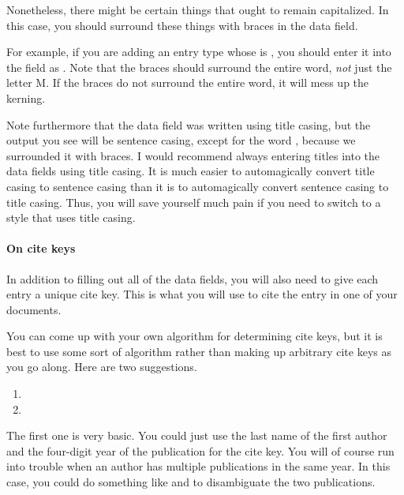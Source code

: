 Nonetheless, there might be certain things that ought to remain capitalized.
In this case, you should surround these things with braces in the data field.

For example, if you are adding an  entry type whose  is , you should enter it into the  field as .
Note that the braces should surround the entire word, \emph{not} just the letter M.
If the braces do not surround the entire word, it will mess up the kerning.

Note furthermore that the data field was written using title casing, but the output you see will be sentence casing, except for the word , because we surrounded it with braces.
I would recommend always entering titles into the data fields using title casing.
It is much easier to automagically convert title casing to sentence casing than it is to automagically convert sentence casing to title casing.
Thus, you will save yourself much pain if you need to switch to a style that uses title casing.

\paragraph{On cite keys}

In addition to filling out all of the data fields, you will also need to give each entry a unique cite key.
This is what you will use to cite the entry in one of your  documents.

You can come up with your own algorithm for determining cite keys, but it is best to use some sort of algorithm rather than making up arbitrary cite keys as you go along.
Here are two suggestions.

\begin{enumerate}[label={(\roman*)}]

	\item{}

	\item{}

\end{enumerate}

The first one is very basic.
You could just use the last name of the first author and the four-digit year of the publication for the cite key.
You will of course run into trouble when an author has multiple publications in the same year.
In this case, you could do something like  and  to disambiguate the two publications.


